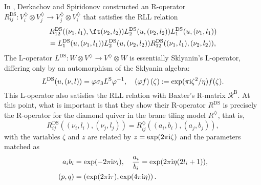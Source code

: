 In \cite{Derkachov:2012iv}, Derkachov and Spiridonov constructed
an R-operator $R_{ij}^{\mathrm{DS}}:V_{i}^{\diamondsuit}\otimes V_{j}^{\diamondsuit}\rightarrow V_{j}^{\diamondsuit}\otimes V_{i}^{\diamondsuit}$
that satisfies the RLL relation
\begin{multline}
    R_{12}^{\mathrm{DS}}((\nu_{1},l_{1}),\ft(\nu_{2},l_{2}))
    L_{2}^{\mathrm{DS}}(u,(\nu_{2},l_{2}))
    L_{1}^{\mathrm{DS}}(u,(\nu_{1},l_{1}))    \\
      =
        L_{1}^{\mathrm{DS}}(u,(\nu_{1},l_{1}))
        L_{2}^{\mathrm{DS}}(u,(\nu_{2},l_{2}))
        R_{12}^{\mathrm{DS}}((\nu_{1},l_{1}),(\nu_{2},l_{2})),
\end{multline}
The L-operator $L^{\mathrm{DS}}:W\otimes V^{\diamondsuit}\to V^{\diamondsuit}\otimes W$
is essentially Sklyanin's L-operator, differing only by an automorphism
of the Sklyanin algebra:
\begin{equation}
    L^{\mathrm{DS}}(u,(\nu,l))
      =  \varphi  \sigma_{3}  L^{\mathrm{S}}\varphi^{-1},
        \quad  \left(\varphi f\right)(\zeta)  :=  \exp(\pi \mathrm{i} \zeta^{2}/\eta)f(\zeta).
\end{equation}
This L-operator also satisfies the RLL relation with Baxter's R-matrix
$\mathcal{R}^{\mathrm{B}}$. At this point, what is important is that
they show their R-operator $R^{\mathrm{DS}}$ is precisely the R-operator
for the diamond quiver in the brane tiling model $R^{\diamondsuit}$,
that is,
\begin{equation}
    R_{ij}^{\mathrm{DS}}((\nu_{i},l_{i}),(\nu_{j},l_{j}))
      =
        R_{ij}^{\diamondsuit}((a_{i},b_{i}),(a_{j},b_{j})),
\end{equation}
with the variables $\zeta$ and $z$ are related by $z=\exp(2\pi \mathrm{i} \zeta)$
and the parameters matched as
\begin{align}
  a_{i} b_{i} &  =  \exp(-2\pi \mathrm{i} \nu_{i}),  \quad  \frac{a_{i}}{b_{i}}  =  \exp(2\pi \mathrm{i}\eta(2l_{i}+1)),  \\
  (p,q)       &  =  \left(\exp(2\pi \mathrm{i}\tau),\exp(4\pi \mathrm{i}\eta)\right).
\end{align}


